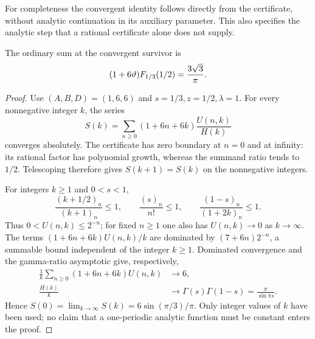 For completeness the convergent identity follows directly from the
certificate, without analytic continuation in its auxiliary
parameter.  This also specifies the analytic step that a rational
certificate alone does not supply.
\begin{corollary}\label{cor:C-wz-affine-value}
The ordinary sum at the convergent survivor is
\[
 (1+6\vartheta)F_{1/3}(1/2)=\frac{3\sqrt3}{\pi}.
\]
\end{corollary}
\begin{proof}
Use $(A,B,D)=(1,6,6)$ and $s=1/3,z=1/2,\lambda=1$.
For every nonnegative integer $k$, the series
\[
 S(k)=\sum_{n\ge0}(1+6n+6k)\frac{U(n,k)}{H(k)}
\]
converges absolutely.  The certificate has zero boundary at $n=0$
and at infinity: its rational factor has polynomial growth, whereas
the summand ratio tends to $1/2$.  Telescoping therefore gives
$S(k+1)=S(k)$ on the nonnegative integers.

For integers $k\ge1$ and $0<s<1$,
\[
 \frac{(k+1/2)_n}{(k+1)_n}\le1,\qquad
 \frac{(s)_n}{n!}\le1,\qquad
 \frac{(1-s)_n}{(1+2k)_n}\le1.
\]
Thus $0<U(n,k)\le2^{-n}$; for fixed $n\ge1$ one also has
$U(n,k)\to0$ as $k\to\infty$.  The terms
$(1+6n+6k)U(n,k)/k$ are dominated by $(7+6n)2^{-n}$, a summable
bound independent of the integer $k\ge1$.  Dominated convergence
and the gamma-ratio asymptotic give, respectively,
\begin{align*}
 \frac1k\sum_{n\ge0}(1+6n+6k)U(n,k)&\longrightarrow6,\\
 \frac{H(k)}k&\longrightarrow
 \Gamma(s)\Gamma(1-s)=\frac\pi{\sin\pi s}.
\end{align*}
Hence $S(0)=\lim_{k\to\infty}S(k)=6\sin(\pi/3)/\pi$.
Only integer values of $k$ have been used; no claim that a
one-periodic analytic function must be constant enters the proof.
\end{proof}

